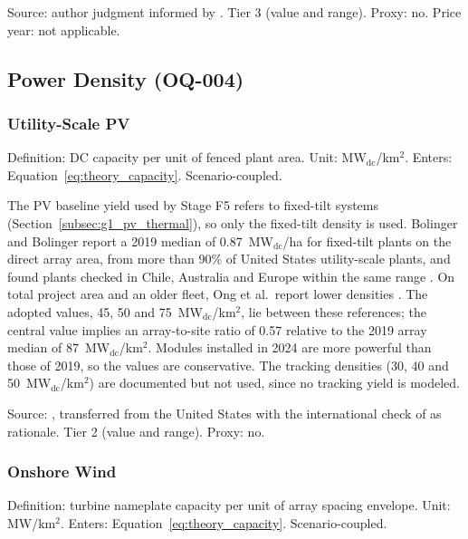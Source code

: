 Source: author judgment informed by \cite{lopez2012,ong2013,turkovska2024}.
Tier 3 (value and range). Proxy: no. Price year: not applicable.

\subsection{Power Density (OQ-004)}
\label{subsec:g1_pd}

\subsubsection{Utility-Scale PV}

Definition: DC capacity per unit of fenced plant area. Unit:
MW$_{\mathrm{dc}}$/km$^2$. Enters: Equation~\ref{eq:theory_capacity}.
Scenario-coupled.

The PV baseline yield used by Stage F5 refers to fixed-tilt systems
(Section~\ref{subsec:g1_pv_thermal}), so only the fixed-tilt density is
used. Bolinger and Bolinger report a 2019 median of
0.87~MW$_{\mathrm{dc}}$/ha for fixed-tilt plants on the direct array
area, from more than 90\% of United States utility-scale plants, and
found plants checked in Chile, Australia and Europe within the same range
\cite{bolinger2022}. On total project area and an older fleet, Ong et
al.\ report lower densities \cite{ong2013}. The adopted values, 45, 50
and 75~MW$_{\mathrm{dc}}$/km$^2$, lie between these references; the
central value implies an array-to-site ratio of 0.57 relative to the
2019 array median of 87~MW$_{\mathrm{dc}}$/km$^2$. Modules installed in 2024
are more powerful than those of 2019, so the values are conservative. The tracking densities (30, 40 and
50~MW$_{\mathrm{dc}}$/km$^2$) are documented but not used, since no
tracking yield is modeled.

Source: \cite{bolinger2022,ong2013}, transferred from the United States
with the international check of \cite{bolinger2022} as rationale. Tier 2
(value and range). Proxy: no.

\subsubsection{Onshore Wind}

Definition: turbine nameplate capacity per unit of array spacing
envelope. Unit: MW/km$^2$. Enters: Equation~\ref{eq:theory_capacity}.
Scenario-coupled.

